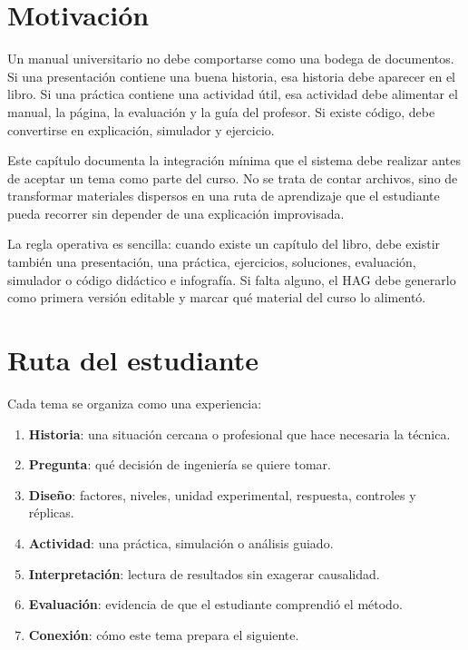 
\section{Motivación}

Un manual universitario no debe comportarse como una bodega de documentos. Si una presentación contiene una buena historia, esa historia debe aparecer en el libro. Si una práctica contiene una actividad útil, esa actividad debe alimentar el manual, la página, la evaluación y la guía del profesor. Si existe código, debe convertirse en explicación, simulador y ejercicio.

Este capítulo documenta la integración mínima que el sistema debe realizar antes de aceptar un tema como parte del curso. No se trata de contar archivos, sino de transformar materiales dispersos en una ruta de aprendizaje que el estudiante pueda recorrer sin depender de una explicación improvisada.

\begin{idea}
La regla operativa es sencilla: cuando existe un capítulo del libro, debe existir también una presentación, una práctica, ejercicios, soluciones, evaluación, simulador o código didáctico e infografía. Si falta alguno, el HAG debe generarlo como primera versión editable y marcar qué material del curso lo alimentó.
\end{idea}

\section{Ruta del estudiante}

Cada tema se organiza como una experiencia:

\begin{enumerate}
  \item \textbf{Historia}: una situación cercana o profesional que hace necesaria la técnica.
  \item \textbf{Pregunta}: qué decisión de ingeniería se quiere tomar.
  \item \textbf{Diseño}: factores, niveles, unidad experimental, respuesta, controles y réplicas.
  \item \textbf{Actividad}: una práctica, simulación o análisis guiado.
  \item \textbf{Interpretación}: lectura de resultados sin exagerar causalidad.
  \item \textbf{Evaluación}: evidencia de que el estudiante comprendió el método.
  \item \textbf{Conexión}: cómo este tema prepara el siguiente.
\end{enumerate}

